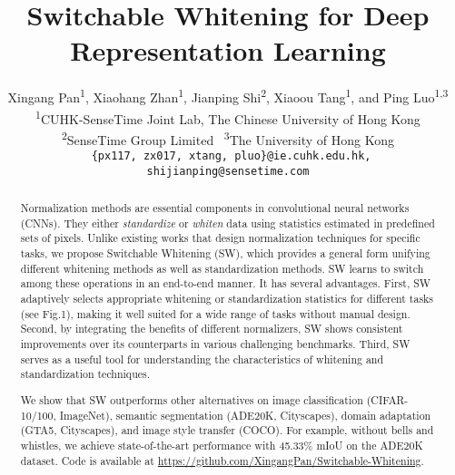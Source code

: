 \documentclass[10pt,twocolumn,letterpaper]{article}
\begin{document}
	
\title{Switchable Whitening for Deep Representation Learning}	
	\author{
		\setlength{\parskip}{1.5\baselineskip}
		Xingang Pan\textsuperscript{1}, 
		Xiaohang Zhan\textsuperscript{1}, 
		Jianping Shi\textsuperscript{2}, 
		Xiaoou Tang\textsuperscript{1},
		and Ping Luo\textsuperscript{1,3}
		\vspace{0.2cm}
		\\
		\normalsize
		\textsuperscript{1}{CUHK-SenseTime Joint Lab, The Chinese University of Hong Kong} \\
		\normalsize
		\textsuperscript{2}{SenseTime Group Limited} \
		\quad\textsuperscript{3}{The University of Hong Kong} \\
		\tt\small
		\{px117, zx017, xtang, pluo\}@ie.cuhk.edu.hk, \
		shijianping@sensetime.com
}


	\maketitle


	
\begin{abstract}
	
	Normalization methods are essential components in convolutional neural networks (CNNs).
They either \textit{standardize} or \textit{whiten} data using statistics estimated in predefined sets of pixels.
Unlike existing works that design normalization techniques for specific tasks, we propose Switchable Whitening (SW), which provides a general form unifying different whitening methods as well as standardization methods. 
	SW learns to switch among these operations in an end-to-end manner.
It has several advantages.
	First, SW adaptively selects appropriate whitening or standardization statistics for different tasks (see Fig.1), making it well suited for a wide range of tasks without manual design.
Second, by integrating the benefits of different normalizers, SW shows consistent improvements over its counterparts in various challenging benchmarks.
Third, SW serves as a useful tool for understanding the characteristics of whitening and standardization techniques.


	We show that SW outperforms other alternatives on image classification (CIFAR-10/100, ImageNet), semantic segmentation (ADE20K, Cityscapes), domain adaptation (GTA5, Cityscapes), and image style transfer (COCO).
For example, without bells and whistles, we achieve state-of-the-art performance with 45.33\% mIoU on the ADE20K dataset.
	Code is available at \url{https://github.com/XingangPan/Switchable-Whitening}.
	
	
\end{abstract}
 	
\end{document}
